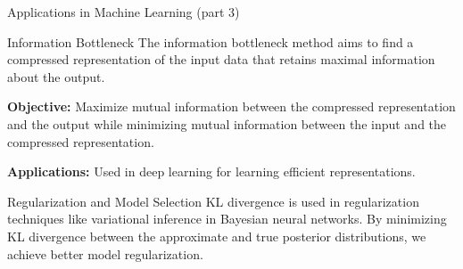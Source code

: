 \documentclass[
aspectratio=169]{beamer}
\begin{document}
\begin{frame}{Applications in Machine Learning (part 3)}
    \begin{block}{Information Bottleneck}
        The information bottleneck method aims to find a compressed representation of the input data that retains maximal information about the output.

        \textbf{Objective:} Maximize mutual information between the compressed representation and the output while minimizing mutual information between the input and the compressed representation.

        \textbf{Applications:} Used in deep learning for learning efficient representations.
    \end{block}

    \begin{block}{Regularization and Model Selection}
        KL divergence is used in regularization techniques like variational inference in Bayesian neural networks. By minimizing KL divergence between the approximate and true posterior distributions, we achieve better model regularization.
    \end{block}
\end{frame}
\end{document}
